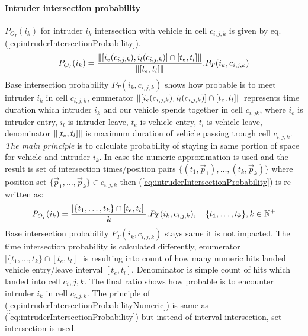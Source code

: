 \paragraph{Intruder intersection probability} $P_{O_I}(i_k)$ for intruder $i_k$ intersection with vehicle in cell $c_{i,j,k}$ is given by eq. (\ref{eq:intruderIntersectionProbability}).
\begin{equation}\label{eq:intruderIntersectionProbability}
    P_{O_I}(i_k)=\frac{\left\lVert[i_e(c_{i,j,k}),i_l(c_{i,j,k})]\cap [t_e,t_l]\right\rVert}{\left\lVert[t_e,t_l]\right\rVert}.P_T(i_k,c_{i,j,k})
\end{equation}
\noindent Base intersection probability $P_T(i_k,c_{i,j,k})$ shows how probable is to meet intruder $i_k$ in cell $c_{i,j,k}$, enumerator $\left\lVert[i_e(c_{i,j,k}),i_l(c_{i,j,k})]\cap [t_e,t_l]\right\rVert$ represents time duration which intruder $i_k$ and our vehicle spends together in cell $c_{i,jk}$, where $i_e$ is intruder entry, $i_l$ is intruder leave, $t_e$ is vehicle entry, $t_l$ is vehicle leave, denominator $\left\lVert[t_e,t_l]\right\rVert$ is maximum duration of vehicle passing trough cell $c_{i,j,k}$. \textit{The main principle} is to calculate probability of staying in same portion of space for vehicle and intruder $i_k$. In case the numeric approximation is used and the result is set of intersection times/position pairs $\{(t_1,\vec{p}_1),\dots,(t_k,\vec{p}_k)\}$ where position set $\{\vec{p}_1,\dots,\vec{p}_k\}\in c_{i,j,k}$  then (\ref{eq:intruderIntersectionProbability}) is re-written as:
\begin{equation}\label{eq:intruderIntersectionProbabilityNumeric}
    P_{O_I}(i_k)=\frac{|\{t_1,\dots,t_k\}\cap [t_e,t_l]|}{k}.P_T(i_k,c_{i,j,k}),\quad \{t_1,\dots,t_k\},k\in \mathbb{N}^+
\end{equation}
\noindent Base intersection probability $P_T(i_k,c_{i,j,k})$  stays same it is not impacted. The time intersection probability is calculated differently, enumerator  $|\{t_1,\dots,t_k\}\cap [t_e,t_l]|$ is resulting into count of how many numeric hits landed vehicle entry/leave interval $[t_e,t_l]$. Denominator is simple count of hits which landed into cell $c_i,j,k$. The final ratio shows how probable is to encounter intruder $i_k$ in cell $c_{i,j,k}$. The principle of (\ref{eq:intruderIntersectionProbabilityNumeric}) is same as (\ref{eq:intruderIntersectionProbability})  but instead of interval intersection, set intersection is used.


